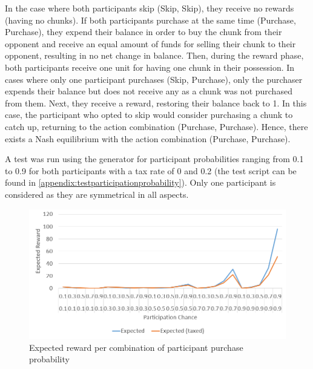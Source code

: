 In the case where both participants skip (Skip, Skip), they receive no rewards (having no chunks). If both participants purchase at the same time (Purchase, Purchase), they expend their balance in order to buy the chunk from their opponent and receive an equal amount of funds for selling their chunk to their opponent, resulting in no net change in balance. Then, during the reward phase, both participants receive one unit for having one chunk in their possession. In cases where only one participant purchases (Skip, Purchase), only the purchaser expends their balance but does not receive any as a chunk was not purchased from them. Next, they receive a reward, restoring their balance back to 1. In this case, the participant who opted to skip would consider purchasing a chunk to catch up, returning to the action combination (Purchase, Purchase). Hence, there exists a Nash equilibrium with the action combination (Purchase, Purchase).

A test was run using the generator for participant probabilities ranging from 0.1 to 0.9 for both participants with a tax rate of 0 and 0.2 (the test script can be found in \cref{appendix:testparticipationprobability}). Only one participant is considered as they are symmetrical in all aspects.

\begin{figure}[H]
  \centering
  \caption{Expected reward per combination of participant purchase probability}
  \label{figure:state-expected}
  \includegraphics[width=\textwidth]{media/state-expected.PNG}
\end{figure}

